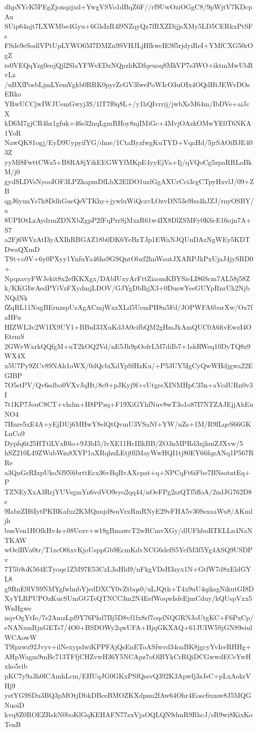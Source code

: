 dhpNYcK5PEgZjonqzjxd+YwgVSVo1dBqZ6F//rf9UwOziOGgC8/9pWjtV7KDcpAu
SUip64njt7LXWMbe4Gyu+6GlsIzR4l9NZqyQz7fRXZDijjsXMy5LD5CERkxPtSFs
FSde9eSodlVPtUpLYWO6M7DMZn9SVHJLjHfkwcIE9f5rjdyiReI+YMfCXG50rOgZ
rs0VEQqYzg0eojQjl2SlaYFWvEDzNQpzhKDfqeuoq8MkVP7s3WO+iktmMwUbRvLz
/uBXfPosbLjmLYemVgkb0RRK0pyrZcGV3lwePoWIcO3uOIx4OQdHtJEWvDOsERko
YRwUCCjwIWJUemGwyj3S/1lT7f0q8L+/y1hQIvrrij/jwbXsM64m/IbDVe+aiJcX
kD6M7gjCR4hr1gfuk+46e32nqLgmRHoy8njIMiGc+4MvjOAzkOMwYE0T6NKA1YoR
NawQK81ogj/EyD9UypyifYG/dme/1CtaByzfwgKuTYD+VqaHd/5jrSAOiBJE403Z
yyMf8FwttCWz5+B8RA8jYikEEGWYfMKpE4yyEjVa+Ij/qVQoCg5zpaRRLoBkM/j0
gydSLDVsNyooIOF3LPZkapmDfLbX2ElDO1uzlGgAXUrCci3cgCTpyHxvlJ/09+ZB
qgJ6yunYe7h8DdhGueQeVTKhy+jywluWiQczvLOzvDN53e9hu4hJZJ/rnyOSBY/a
8UPIOtLzAydrmZDNXbZgpP2fFqPrrSjMxzR61w4IX8DlZSMFy0K6cE16ojn7A+S7
a2Fj6WVzAtI3yAXIhRBGAZ18b0DK6YeBzTJp1EWaNJQUuDAzNgWEy5KDTDwaQXmD
TSt+o9V+6y0PXyy1YnfuYa46hs9GSQntObzf2hnWautJXARPJkPxUjaJ4jySRD0+
NpqzavyFWJekit8x2efKKXgx/DAbIUxyArFttZiaomKBYSieLI86Scm7AL58j58Z
k/KKGIwAedPYiVzFXydmjLDOV/GJYgDbIhjX3+0DuswYeeGUYpRnrUh2NjbNQdNk
fZqRL11NugBErnzspUzAgACmjWxzXLd5UemPH8n5Fd/JOPWFA6burXw/Oa7faHFu
HIZWL3v2W1IX9UY1+BBuI33XuKdJA0cifbQM2gHmJkAmQUC0A6fivEwzI4OEtrmS
2GWvWxrkQQfgM+uT2kOQ2Vd/nE5Jh9pOofrLM7diIb7+1skRWeq10DyTQ8z9WX4X
x5U7Py9ZCv89NAh1oWX/0dQcbiXdYpSfHzKu/+P53UY5IgCyQwWHdjgwa22EGIBP
7O5stPV/Qv6sdbo0VXvJqHt/8e9+pJKyj9f+cUtgreXINMHpC35n+aVcdURn0v3I
7t1KP7JouC8CT+vhdm+H8PPzq+F19XiGYhfNuv8wT3o1o87I7NTZAJEjjAhEuNO4
7Hnre5xE4A+yEjDUj6MHwY8elQtQvmU3VSaNf+YW/nZs+1M/R9fLqeS66GKLnCo9
Dypfq6t25HTtlLVxI0lo+9J3bI5/lvXE11HcIIlkBB/ZO3nMPRd3xjhuiZJXvw/5
hSZ210L49ZWubWm8XYP1aXRqhuLEtj0llMayWwHQI1tj80EY66fqzANq1P567RRe
a3QnGrRIxpUkoNf9N6brttEcx36vBqBvAXcpat+q+NPCqFt6iFbe7BNsotntEq+P
TZNEyXxA3RrjYUVsgmYn6vdVO9syo2qq44/nOeFPg2szQTf5ffoA/2ndJG762D8s
9IabzZH6IytPKBKafxz2KMQnujd8suVrxRmRNyE29vFHA5v30SsxaaWu8/AKmljh
busVen1HOfkHv4s+08Uezv+w18gBmawcT2wRCmvXGy/dlUFhboRTELLn4NaNTKAW
wOelRVa0tr/T1zcO0ixvKjoUsppGb9EcmKdvNCG6defS5YefM3f5Yg4ASQ9USDPv
7T5b9oK564ETyoqe1ZM97E53CzL3aHld9/nFkgVDsH3zyx1N+GtfW7d8xEldGYL8
g9RnE9lVS9NMYgfwlmbYjedDXCY0vZtbqs0/uLJQth+T4x9uU4qiksgNikutGI8D
XyYLRPUPOzKucSUmGGTeQTNCC3m2N4EefWoqwIsfeEjmCduy/kQUspVxx5WnHgwe
nqvOgYtIo/7s2AmzLpf9Y76Pkd7Bj5D8vf1fx8rf7oqdNQGRNJoUtgKC+F6PxCp/
eNANzmRjnGETs7/4O0+BSDOWy2qwUFA+HjqGKXAQ+61JUIW5SjGN89eiulWCAowW
T9lpzwz92Jvyv+ilNexypdwiKPPFAjQsEnEToASfwvd34oaBK8jgcyYvIreRHHg+
AHpWagm9mBc713TFfjCHZvwH36Y5NCApz7oOlBYkCrRQiDCGwwdECeYwHxko5cib
pKC7y9a3h0fCAmhLcm/EHUqJG0GKxPSfQssvQ392K3Apwfj3zJsC+pLxAokrVHj9
ystYG9SDu3BQ3pMOtjDbkDBceBMOZKXdpnu2fAw64Ohr4Eosc6xmw8J5MQGNuoiD
kvq8Z0ROEZRskN0boKlGqKEHAFN77zxVjaOQLQN9dmR9RhcJ/sR9wi8KixKoTenB
